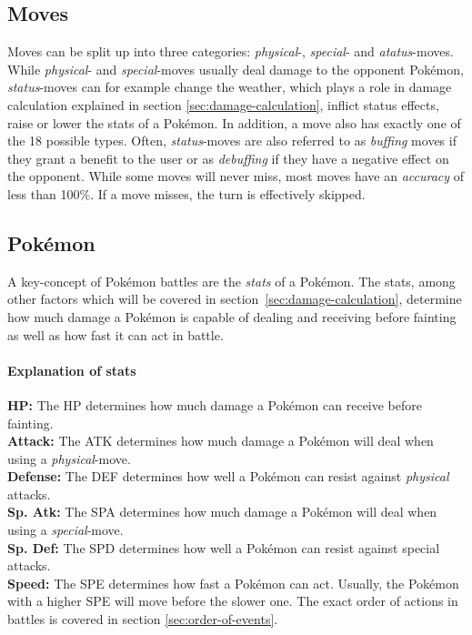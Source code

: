 \subsection{Moves}
\label{sec:moves}
Moves can be split up into three categories: \textit{physical}-, \textit{special}- and \textit{atatus}-moves.
While \textit{physical}- and \textit{special}-moves usually deal damage to the opponent Pokémon, 
\textit{status}-moves can for example change the weather, which plays a role in damage calculation explained
in section \ref{sec:damage-calculation}, inflict status effects, raise or lower the stats of a Pokémon. In 
addition, a move also has exactly one of the 18 possible types. Often, \textit{status}-moves are also referred
to as \textit{buffing} moves if they grant a benefit to the user or as \textit{debuffing} if they have a
negative effect on the opponent. While some moves will never miss, most moves have an \textit{accuracy}
of less than 100\%. If a move misses, the turn is effectively skipped. 

\subsection{Pokémon}
\label{sec:pokemon}
A key-concept of Pokémon battles are the \textit{stats} of a Pokémon. The stats, among other factors 
which will be covered in section~\ref{sec:damage-calculation}, determine how much damage a Pokémon
is capable of dealing and receiving before fainting as well as how fast it can act in battle.
\paragraph{Explanation of stats}
\textbf{HP:} The \ac{HP} determines how much damage a Pokémon can receive before fainting. \\
\textbf{Attack:} The \ac{ATK} determines how much damage a Pokémon will deal when using 
a \textit{physical}-move. \\
\textbf{Defense:} The \ac{DEF} determines how well a Pokémon can resist against \textit{physical} attacks. \\
\textbf{Sp. Atk:} The \ac{SPA} determines how much damage a Pokémon will deal when using
a \textit{special}-move. \\
\textbf{Sp. Def:} The \ac{SPD} determines how well a Pokémon can resist against special attacks. \\
\textbf{Speed:} The \ac{SPE} determines how fast a Pokémon can act. Usually, the Pokémon with a higher
\ac{SPE} will move before the slower one. The exact order of actions in battles is covered in section
\ref{sec:order-of-events}.

